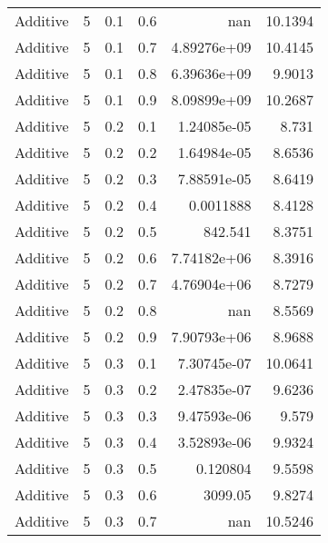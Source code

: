 \documentclass{article}
\begin{document}
\begin{longtable}[H]{lrrrrr}
 Additive       &       5 &   0.1 &            0.6 &    nan           &         10.1394 \\
 Additive       &       5 &   0.1 &            0.7 &      4.89276e+09 &         10.4145 \\
 Additive       &       5 &   0.1 &            0.8 &      6.39636e+09 &          9.9013 \\
 Additive       &       5 &   0.1 &            0.9 &      8.09899e+09 &         10.2687 \\
 Additive       &       5 &   0.2 &            0.1 &      1.24085e-05 &          8.731  \\
 Additive       &       5 &   0.2 &            0.2 &      1.64984e-05 &          8.6536 \\
 Additive       &       5 &   0.2 &            0.3 &      7.88591e-05 &          8.6419 \\
 Additive       &       5 &   0.2 &            0.4 &      0.0011888   &          8.4128 \\
 Additive       &       5 &   0.2 &            0.5 &    842.541       &          8.3751 \\
 Additive       &       5 &   0.2 &            0.6 &      7.74182e+06 &          8.3916 \\
 Additive       &       5 &   0.2 &            0.7 &      4.76904e+06 &          8.7279 \\
 Additive       &       5 &   0.2 &            0.8 &    nan           &          8.5569 \\
 Additive       &       5 &   0.2 &            0.9 &      7.90793e+06 &          8.9688 \\
 Additive       &       5 &   0.3 &            0.1 &      7.30745e-07 &         10.0641 \\
 Additive       &       5 &   0.3 &            0.2 &      2.47835e-07 &          9.6236 \\
 Additive       &       5 &   0.3 &            0.3 &      9.47593e-06 &          9.579  \\
 Additive       &       5 &   0.3 &            0.4 &      3.52893e-06 &          9.9324 \\
 Additive       &       5 &   0.3 &            0.5 &      0.120804    &          9.5598 \\
 Additive       &       5 &   0.3 &            0.6 &   3099.05        &          9.8274 \\
 Additive       &       5 &   0.3 &            0.7 &    nan           &         10.5246 \\

\end{longtable}
\end{document}
